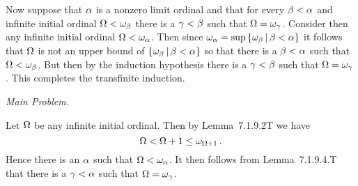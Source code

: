\begin{questions}
\begin{solution}
{        Now suppose that $\alpha$ is a nonzero limit ordinal and that for every $\beta < \alpha$ and infinite initial ordinal $\Omega < \omega_\beta$ there is a $\gamma < \beta$ such that $\Omega = \omega_\gamma$.
        Consider then any infinite initial ordinal $\Omega < \omega_\alpha$.
        Then since $\omega_\alpha = \sup\left\{ \omega_\beta \,|\, \beta < \alpha \right\}$ it follows that $\Omega$ is not an upper bound of $\left\{ \omega_\beta \,|\, \beta < \alpha \right\}$ so that there is a $\beta < \alpha$ such that $\Omega < \omega_\beta$.
        But then by the induction hypothesis there is a $\gamma < \beta$ such that $\Omega = \omega_\gamma$.
        This completes the transfinite induction. \qedsymbol
    }

    \emph{Main Problem.}

    Let $\Omega$ be any infinite initial ordinal.
    Then by Lemma~7.1.9.2T we have
    $$
    \Omega < \Omega + 1 \leq \omega_{\Omega+1} \,.
    $$
    Hence there is an $\alpha$ such that $\Omega < \omega_\alpha$.
    It then follows from Lemma~7.1.9.4.T that there is a $\gamma < \alpha$ such that $\Omega = \omega_\gamma$. \qedsymbol
\end{solution}


\end{questions}

